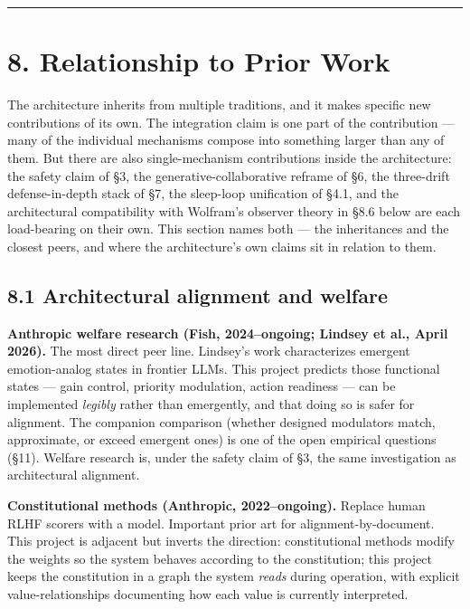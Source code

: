 \documentclass[12pt]{article}
\begin{document}
\begin{center}\rule{0.5\linewidth}{0.5pt}\end{center}

\section{8. Relationship to Prior Work}\label{relationship-to-prior-work}

The architecture inherits from multiple traditions, and it makes specific new contributions of its own. The integration claim is one part of the contribution --- many of the individual mechanisms compose into something larger than any of them. But there are also single-mechanism contributions inside the architecture: the safety claim of §3, the generative-collaborative reframe of §6, the three-drift defense-in-depth stack of §7, the sleep-loop unification of §4.1, and the architectural compatibility with Wolfram's observer theory in §8.6 below are each load-bearing on their own. This section names both --- the inheritances and the closest peers, and where the architecture's own claims sit in relation to them.

\subsection{8.1 Architectural alignment and welfare}\label{architectural-alignment-and-welfare}

\textbf{Anthropic welfare research (Fish, 2024--ongoing; Lindsey et al., April 2026).} The most direct peer line. Lindsey's work characterizes emergent emotion-analog states in frontier LLMs. This project predicts those functional states --- gain control, priority modulation, action readiness --- can be implemented \emph{legibly} rather than emergently, and that doing so is safer for alignment. The companion comparison (whether designed modulators match, approximate, or exceed emergent ones) is one of the open empirical questions (§11). Welfare research is, under the safety claim of §3, the same investigation as architectural alignment.

\textbf{Constitutional methods (Anthropic, 2022--ongoing).} Replace human RLHF scorers with a model. Important prior art for alignment-by-document. This project is adjacent but inverts the direction: constitutional methods modify the weights so the system behaves according to the constitution; this project keeps the constitution in a graph the system \emph{reads} during operation, with explicit value-relationships documenting how each value is currently interpreted.
\end{document}
